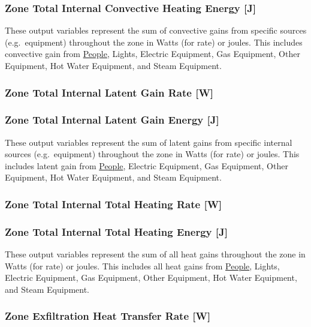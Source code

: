 \subsubsection{Zone Total Internal Convective Heating Energy {[}J{]}}\label{zone-total-internal-convective-heating-energy-j}

These output variables represent the sum of convective gains from specific sources (e.g.~equipment) throughout the zone in Watts (for rate) or joules. This includes convective gain from \hyperref[people]{People}, Lights, Electric Equipment, Gas Equipment, Other Equipment, Hot Water Equipment, and Steam Equipment.

\subsubsection{Zone Total Internal Latent Gain Rate {[}W{]}}\label{zone-total-internal-latent-gain-rate-w}

\subsubsection{Zone Total Internal Latent Gain Energy {[}J{]}}\label{zone-total-internal-latent-gain-energy-j}

These output variables represent the sum of latent gains from specific internal sources (e.g.~equipment) throughout the zone in Watts (for rate) or joules. This includes latent gain from \hyperref[people]{People}, Electric Equipment, Gas Equipment, Other Equipment, Hot Water Equipment, and Steam Equipment.

\subsubsection{Zone Total Internal Total Heating Rate {[}W{]}}\label{zone-total-internal-total-heating-rate-w}

\subsubsection{Zone Total Internal Total Heating Energy {[}J{]}}\label{zone-total-internal-total-heating-energy-j}

These output variables represent the sum of all heat gains throughout the zone in Watts (for rate) or joules. This includes all heat gains from \hyperref[people]{People}, Lights, Electric Equipment, Gas Equipment, Other Equipment, Hot Water Equipment, and Steam Equipment.

\subsubsection{Zone Exfiltration Heat Transfer Rate {[}W{]}}\label{zone-exfiltration-heat-transfer-rate-w}

